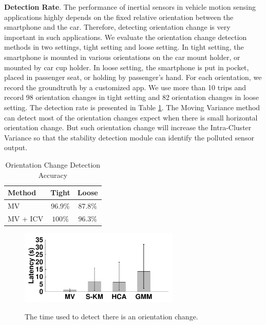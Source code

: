 \textbf{Detection Rate}.
The performance of inertial sensors in vehicle
motion sensing applications highly depends
on the fixed relative orientation between
the smartphone and the car. 
Therefore, detecting orientation change is 
very important in such applications. 
We evaluate the orientation change detection methods 
in two settings, tight setting and loose setting. 
In tight setting, the smartphone is mounted in 
various orientations on the car mount holder, 
or mounted by car cup holder. 
In loose setting, the smartphone is put in 
pocket, placed in passenger seat, or holding by 
passenger's hand. 
For each orientation, we record 
the groundtruth by a customized app. 
We use more than 10 trips and record
98 orientation changes in tight setting 
and 82 orientation changes in loose setting. 
The detection rate is presented in Table \ref{evaluate_change}. 
The Moving Variance method can detect most
of the orientation changes expect when 
there is small horizontal orientation change. 
But such orientation change will increase the 
Intra-Cluster Variance so that the stability 
detection module can identify
the polluted sensor output. 


\begin{table}[ht]
        \vspace{0.5cm}
        \centering
        \caption[evaluate_change]{Orientation Change Detection Accuracy}
         \vspace{0.0cm}
        \label{evaluate_change}
                \begin{tabular}{|l|c|c|}
                \hline
Method & Tight & Loose
\\  \hline      \hline
MV & $96.9\%$  &  $87.8\%$ 
\\  \hline
MV + ICV & $100\%$ & $96.3\%$   
\\  \hline
     \end{tabular}
\end{table}


 



\begin{figure}[!htbp]
\begin{center}
\includegraphics[width=3.0in,angle=0]{Figs/DriveSense/clustering_methods.pdf}
\vspace{0.0cm}
\caption{The time used to detect there is an orientation change.}
\vspace{-0.2cm}
\label{evaluate_latency}
\end{center}
\end{figure}



